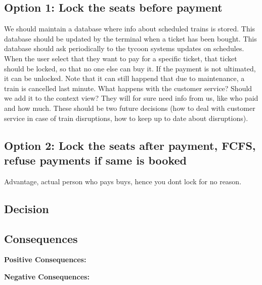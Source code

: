 \subsection*{Option 1: Lock the seats before payment}
We should maintain a database where info about scheduled trains is stored. 
This database should be updated by the terminal when a ticket has been bought.
This database should ask periodically to the tycoon systems updates on schedules.
When the user select that they want to pay for a specific ticket, that ticket should be locked, so that no one else can buy it. 
If the payment is not ultimated, it can be unlocked.
Note that it can still happend that due to maintenance, a train is cancelled last minute. 
What happens with the customer service? Should we add it to the context view? They will for sure need info from us, like who paid and how much. 
These should be two future decisions (how to deal with customer service in case of train disruptions, how to keep up to date about disruptions).

\subsection*{Option 2: Lock the seats after payment, FCFS, refuse payments if same is booked}
Advantage, actual person who pays buys, hence you dont lock for no reason.

\subsection*{Decision}

\subsection*{Consequences}
\textbf{Positive Consequences:}
\begin{itemize}
\end{itemize}
\textbf{Negative Consequences:}
\begin{itemize}
\end{itemize}